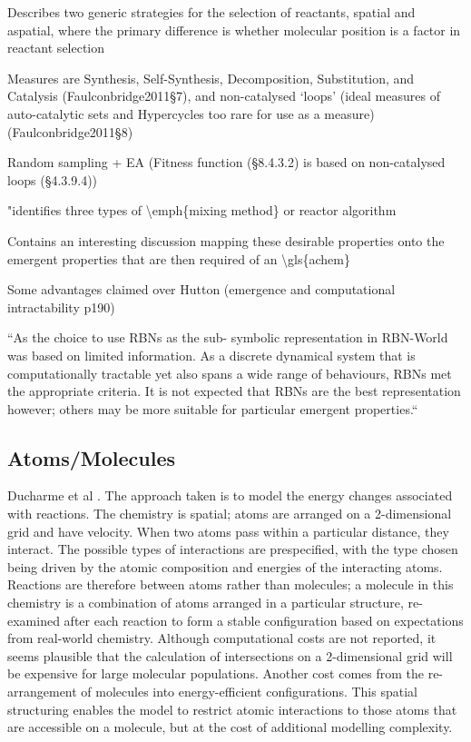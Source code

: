 Describes two generic strategies for the selection of reactants, spatial and aspatial, where the primary difference is whether molecular position is a factor in reactant selection

Measures are Synthesis, Self-Synthesis, Decomposition, Substitution, and Catalysis (Faulconbridge2011§7), and non-catalysed `loops' (ideal measures of auto-catalytic sets and Hypercycles too rare for use as a measure) (Faulconbridge2011§8)

Random sampling + EA (Fitness function (§8.4.3.2) is based on non-catalysed loops (§4.3.9.4))		

"identifies three types of \textbackslash{}emph\{mixing method\} or reactor algorithm			

Contains an interesting discussion mapping these desirable properties onto the emergent properties that are then required of an \textbackslash{}gls\{achem\}

Some advantages claimed over Hutton (emergence and computational intractability p190)

``As the choice to use RBNs as the sub- symbolic representation in RBN-World was based on limited information. As a discrete dynamical system that is computationally tractable yet also spans a wide range of behaviours, RBNs met the appropriate criteria. It is not expected that RBNs are the best representation however; others may be more suitable for particular emergent properties.``

\subsection{Atoms/Molecules}

Ducharme et al \parencite{Ducharme2012}. The approach taken is to model the energy changes associated with reactions. The chemistry is spatial; atoms are arranged on a 2-dimensional grid and have velocity. When two atoms pass within a particular distance, they interact. The possible types of interactions are prespecified, with the type chosen being driven by the atomic composition and energies of the interacting atoms. Reactions are therefore between atoms rather than molecules; a molecule in this chemistry is a combination of atoms arranged in a particular structure, re-examined after each reaction to form a stable configuration based on expectations from real-world chemistry. Although computational costs are not reported, it seems plausible that the calculation of intersections on a 2-dimensional grid will be expensive for large molecular populations. Another cost comes from the re-arrangement of molecules into energy-efficient configurations. This spatial structuring enables the model to restrict atomic interactions to those atoms that are accessible on a molecule, but at the cost of additional modelling complexity. 



